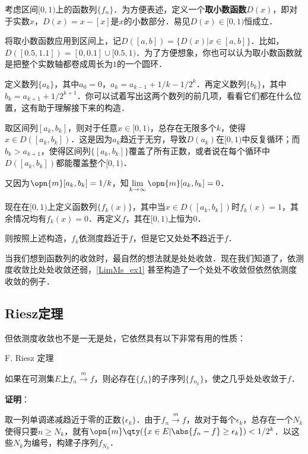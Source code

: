 \begin{example}{}\label{LimMs_ex1}

考虑区间$[0, 1)$上的函数列$\{f_n\}$．为方便表述，定义一个\textbf{取小数函数}$D(x)$，即对于实数$x$，$D(x)=x-[x]$是$x$的小数部分．易见$D(x)\in [0, 1)$恒成立．

将取小数函数应用到区间上，记$D([a, b])=\{D(x)|x\in[a, b]\}$．比如，$D([0.5, 1.1])=[0, 0.1]\cup[0.5, 1)$．为了方便想象，你也可以认为取小数函数就是把整个实数轴都卷成周长为$1$的一个圆环．

定义数列$\{a_k\}$，其中$a_0=0$，$a_k=a_{k-1}+1/k-1/2^k$．再定义数列$\{b_k\}$，其中$b_k=a_{k+1}+1/2^{k+1}$．你可以试着写出这两个数列的前几项，看看它们都在什么位置，这有助于理解接下来的构造．

取区间列$[a_k, b_k]$，则对于任意$x\in[0, 1)$，总存在无限多个$k$，使得$x\in D([a_k, b_k])$．这是因为$a_k$趋近于无穷，导致$D(a_k)$在$[0, 1)$中反复循环；而$b_k>a_{k+1}$，使得区间列$\{[a_k, b_k]\}$覆盖了所有正数，或者说在每个循环中$D([a_k, b_k])$都能覆盖整个$[0, 1)$．

又因为$\opn{m}[a_k, b_k]=1/k$，知$\lim\limits_{k\to \infty}\opn{m}[a_k, b_k]=0$．

现在在$[0, 1)$上定义函数列$\{f_k(x)\}$，其中当$x\in D([a_k, b_k])$时$f_k(x)=1$，其余情况均有$f_k(x)=0$．再定义$f$，其在$[0, 1)$上恒为$0$．

则按照上述构造，$f_k$依测度趋近于$f$，但是它又处处\textbf{不}趋近于$f$．

\end{example}

当我们想到函数列的收敛时，最自然的想法就是处处收敛．现在我们知道了，依测度收敛比处处收敛还弱，\autoref{LimMs_ex1} 甚至构造了一个处处不收敛但依然依测度收敛的例子．


\subsection{Riesz定理}



但依测度收敛也不是一无是处，它依然具有以下非常有用的性质：

\begin{theorem}{F. Riesz 定理}

如果在可测集$E$上$f_n\overset{m}\to f$，则必存在$\{f_n\}$的子序列$\{f_{n_k}\}$，使之几乎处处收敛于$f$．

\end{theorem}

\textbf{证明}：

取一列单调递减趋近于零的正数$\{\epsilon_k\}$．由于$f_n\overset{m}\to f$，故对于每个$\epsilon_k$，总存在一个$N_k$使得只要$n\geq N_k$，就有$\opn{m}\qty(\{x\in E|\abs{f_n-f}\geq\epsilon_k\})<1/2^k$．以这些$N_k$为编号，构建子序列$f_{N_k}$．

